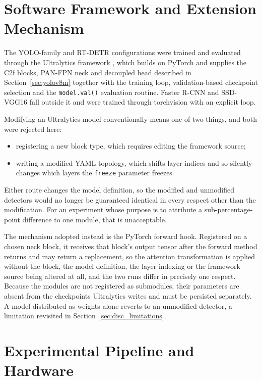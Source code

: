\documentclass[MScCS]{uccthesis}
\begin{document}
\section{Software Framework and Extension Mechanism}
\label{sec:framework}

The YOLO-family and RT-DETR configurations were trained and evaluated through
the Ultralytics framework \parencite{ultralytics2023yolov8}, which builds on
PyTorch \parencite{paszke2019pytorch} and supplies the C2f blocks, PAN-FPN neck
and decoupled head described in Section~\ref{sec:yolov8m} together with the
training loop, validation-based checkpoint selection and the
\texttt{model.val()} evaluation routine. Faster R-CNN and SSD-VGG16 fall
outside it and were trained through torchvision with an explicit loop.

Modifying an Ultralytics model conventionally means one of two things, and both
were rejected here:

\begin{itemize}
   \item registering a new block type, which requires editing the framework
      source;
   \item writing a modified YAML topology, which shifts layer indices and so
      silently changes which layers the \texttt{freeze} parameter freezes.
\end{itemize}

Either route changes the model definition, so the modified and unmodified
detectors would no longer be guaranteed identical in every respect other than
the modification. For an experiment whose purpose is to attribute a
sub-percentage-point difference to one module, that is unacceptable.

The mechanism adopted instead is the PyTorch forward hook. Registered on a
chosen neck block, it receives that block's output tensor after the forward
method returns and may return a replacement, so the attention transformation is
applied without the block, the model definition, the layer indexing or the
framework source being altered at all, and the two runs differ in precisely one
respect. Because the modules are not registered as submodules, their parameters
are absent from the checkpoints Ultralytics writes and must be persisted
separately. A model distributed as weights alone reverts to an unmodified
detector, a limitation revisited in Section~\ref{sec:disc_limitations}.

\section{Experimental Pipeline and Hardware}
\label{sec:hardware}
\end{document}
